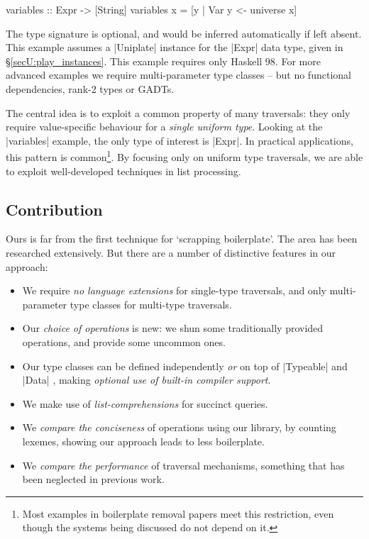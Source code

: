 \begin{code}
variables :: Expr -> [String]
variables x = [y | Var y <- universe x]
\end{code}

The type signature is optional, and would be inferred automatically if left absent. This example assumes a |Uniplate| instance for the |Expr| data type, given in \S\ref{secU:play_instances}. This example requires only Haskell 98. For more advanced examples we require multi-parameter type classes \cite{jones:mptc} -- but no functional dependencies, rank-2 types or GADTs.

The central idea is to exploit a common property of many traversals: they only require value-specific behaviour for a \textit{single uniform type}. Looking at the |variables| example, the only type of interest is |Expr|. In practical applications, this pattern is common\footnote{Most examples in boilerplate removal papers meet this restriction, even though the systems being discussed do not depend on it.}. By focusing only on uniform type traversals, we are able to exploit well-developed techniques in list processing.

\subsection{Contribution}

Ours is far from the first technique for `scrapping boilerplate'. The area has been researched extensively. But there are a number of distinctive features in our approach:

\begin{itemize}
\item We require \textit{no language extensions} for single-type traversals, and only multi-parameter type classes for multi-type traversals.
\item Our \textit{choice of operations} is new: we shun some traditionally provided operations, and provide some uncommon ones.
\item Our type classes can be defined independently \textit{or} on top of |Typeable| and |Data| \citep{lammel:syb}, making \textit{optional use of built-in compiler support}.
\item We make use of \textit{list-comprehensions} \citep{wadler:list_comprehensions} for succinct queries.
\item We \textit{compare the conciseness} of operations using our library, by counting lexemes, showing our approach leads to less boilerplate.
\item We \textit{compare the performance} of traversal mechanisms, something that has been neglected in previous work.
\end{itemize}

